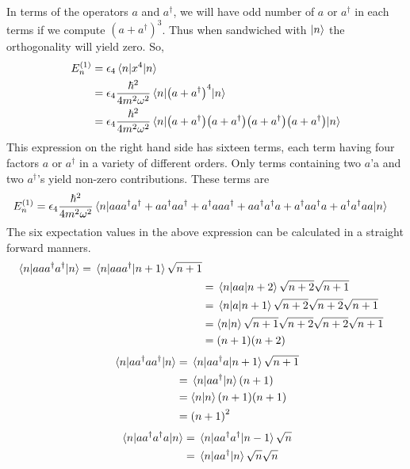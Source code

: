\begin{enumerate}[label=Problem.\arabic*,start=1]
			In terms of the operators $a$ and $a^\dagger$, we will have odd number of $a$ or $a^\dagger$ in each terms if we compute $(a+a^\dagger)^3$. Thus when sandwiched with $\ket{n}$ the orthogonality will yield zero.
			So,
			\begin{align*}
				E_n^{(1)} &=  \epsilon_4 \expval{x^4}{n} \\
				&= \epsilon_4 \frac{\hbar^2}{4 m^2 \omega^2} \expval{\qty(a+a^\dagger)^4}{n}\\
				&= \epsilon_4 \frac{\hbar^2}{4 m^2 \omega^2} \expval{\qty(a+a^\dagger)\qty(a+a^\dagger)\qty(a+a^\dagger)\qty(a+a^\dagger)}{n}
			\end{align*}
			This expression on the right hand side has sixteen terms, each term having four factors $a$ or $a^\dagger$ in a variety of different orders. Only terms containing two $a$'a and two $a^\dagger$'s yield non-zero contributions. These terms are
						\begin{align*}
			E_n^{(1)} 
			&= \epsilon_4 \frac{\hbar^2}{4 m^2 \omega^2} \expval{a a a^\dagger a^\dagger + a a^\dagger a a^\dagger +  a^\dagger a a a^\dagger + a a^\dagger a^\dagger a + a^\dagger a a^\dagger a + a^\dagger a^\dagger a a}{n}
			\end{align*}
			The six expectation values in the above expression can be calculated in a straight forward manners.
			\begin{align*}
				\expval{a a a^\dagger a^\dagger}{n} = \matrixelement{n}{a a a^\dagger}{n+1} \sqrt{n + 1} \\
				&= \mel{n}{a a }{n+2} \sqrt{n+2} \sqrt{n+1} \\
				&= \mel{n}{a}{n+1} \sqrt{n+2} \sqrt{n+2} \sqrt{n+1} \\
				&= \braket{n}{n} \sqrt{n+1} \sqrt{n+2} \sqrt{n+2} \sqrt{n+1} \\
				&= (n+1) (n+2)
			\end{align*}
			\begin{align*}
				\expval{a a^\dagger a a^\dagger}{n} &= \mel{n}{a a^\dagger a}{n+1} \sqrt{n+1} \\
				&= \mel{n}{a a^\dagger}{n} \qty(n+1) \\
				&= \braket{n}{n} \qty(n+1) \qty(n+1)\\
				&= \qty(n+1)^2
			\end{align*}
			\begin{align*}
				\expval{a a^\dagger a^\dagger a}{n} &= \mel{n}{a a^\dagger a^\dagger}{n-1} \sqrt{n} \\
				&= \mel{n}{a a^\dagger}{n} \sqrt{n} \sqrt{n} \\

\end{align*}
\end{enumerate}
